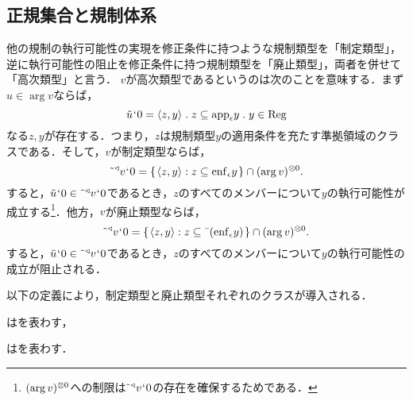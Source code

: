 
\subsection{正規集合と規制体系}
\label{ssec:正規集合と規制体系}

他の規制の執行可能性の実現を修正条件に持つような規制類型を「制定類型」，逆に執行可能性の阻止を修正条件に持つ規制類型を「廃止類型」，両者を併せて「高次類型」と言う．
$ v $が高次類型であるというのは次のことを意味する．まず$ u\in\arg v $ならば，
\[
    \tilde{u}\fap 0 = \orp{z,y}\con{1}z\subseteq\app{\epsilon} y\con{1}y\in\mathrm{Reg}
\]
なる$ z,y $が存在する．つまり，$z$は規制類型$y$の適用条件を充たす準拠領域のクラスである．そして，$v$が制定類型ならば，
\[
    \tilde{\:\:}{^\triangleleft}v{\mspace{1mu}{`}\mspace{1mu}} 0 = \{\mspace{2mu}\langle z,y \rangle:z\subseteq\mathrm{enf}_{\epsilon}y\mspace{2mu}\}\cap(\arg v)^{\otimes 0}.
\]
すると，$ \tilde{u}{\mspace{1mu}{`}\mspace{1mu}} 0\in \tilde{\:\:}{^\triangleleft}v{\mspace{1mu}{`}\mspace{1mu}} 0 $であるとき，$z$のすべてのメンバーについて$y$の執行可能性が成立する\footnote{
    $ (\arg v)^{\otimes 0} $への制限は$ \tilde{\:\:}{^\triangleleft}v{\mspace{1mu}{`}\mspace{1mu}} 0 $の存在を確保するためである．
}．他方，$v$が廃止類型ならば，
\[
    \tilde{\:\:}{^\triangleleft}v{\mspace{1mu}{`}\mspace{1mu}} 0 = \{\mspace{2mu}\langle z,y \rangle:z\subseteq\bar{\:\:}(\mathrm{enf}_{\epsilon}y)\mspace{2mu}\}\cap(\arg v)^{\otimes 0}.
\]
すると，$ \tilde{u}{\mspace{1mu}{`}\mspace{1mu}} 0\in \tilde{\:\:}{^\triangleleft}v{\mspace{1mu}{`}\mspace{1mu}} 0 $であるとき，$z$のすべてのメンバーについて$y$の執行可能性の成立が阻止される．

以下の定義により，制定類型と廃止類型それぞれのクラスが導入される．

\begin{df}
\label{df:制定類型}
はを表わす，
\end{df}

\begin{df}
\label{df:廃止類型}
はを表わす．
\end{df}


